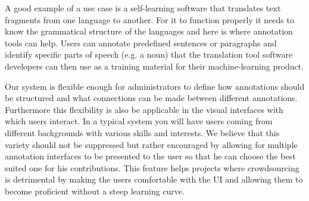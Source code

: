 A good example of a use case is a self-learning software that translates text fragments
from one language to another.  For it to function properly it needs to know the
grammatical structure of the languages and here is where annotation tools can help.  Users
can annotate predefined sentences or paragraphs and identify specific parts of speech
(e.g. a noun) that the translation tool software developers can then use as a training
material for their machine-learning product.

Our system is flexible enough for administrators to
define how annotations should be structured and what connections can be made between
different annotations.  Furthermore this flexibility is also be applicable in the
visual interfaces with which users interact. In a typical system you will have users
coming from different backgrounds with various skills and interests. We believe that this
variety should not be suppressed but rather encouraged by allowing for multiple annotation
interfaces to be presented to the user so that he can choose the best suited one for his
contributions. This feature helps projects where crowdsourcing is detrimental by making
the users comfortable with the UI and allowing them to become proficient without a steep
learning curve.

